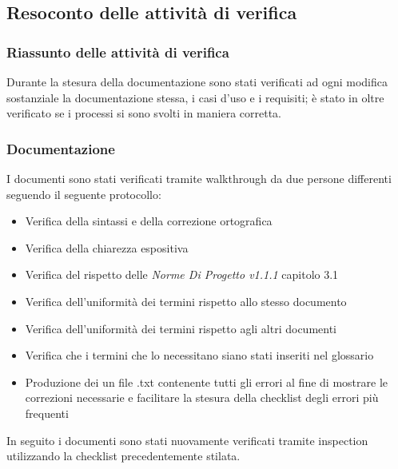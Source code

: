 \documentclass[a4paper]{article}
\begin{document}
				\subsection{Resoconto delle attività di verifica}
				\subsubsection{Riassunto delle attività di verifica}
			Durante la stesura della documentazione sono stati verificati ad ogni modifica sostanziale la documentazione stessa, i
			casi d'uso e i requisiti; è stato in oltre verificato se i processi si sono svolti in maniera corretta.
			\subsubsection{Documentazione}
				I documenti sono stati verificati tramite walkthrough da due persone differenti seguendo il seguente protocollo:
				\begin{itemize}
					\item Verifica della sintassi e della correzione ortografica
					\item Verifica della chiarezza espositiva
					\item Verifica del rispetto delle \emph{Norme Di Progetto v1.1.1} capitolo 3.1
					\item Verifica dell'uniformità dei termini rispetto allo stesso documento
					\item Verifica dell'uniformità dei termini rispetto agli altri documenti
					\item Verifica che i termini che lo necessitano siano stati inseriti nel glossario
					\item Produzione dei un file .txt contenente tutti gli errori al fine di mostrare le correzioni necessarie e
					facilitare la stesura della checklist degli errori più frequenti
				\end{itemize}
				In seguito i documenti sono stati nuovamente verificati tramite inspection utilizzando la checklist precedentemente
				stilata.
			
\end{document}
